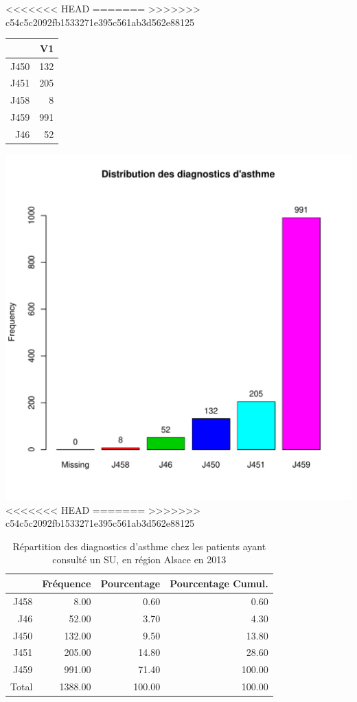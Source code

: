 \documentclass[12pt,english,french,twoside]{book}\usepackage[]{graphicx}\usepackage[]{color}
\makeatletter
\def\maxwidth{ %
  \ifdim\Gin@nat@width>\linewidth
    \linewidth
  \else
    \Gin@nat@width
  \fi
}
\makeatother
\begin{document}
<<<<<<< HEAD
=======
>>>>>>> c54c5c2092fb1533271e395c561ab3d562e88125
\begin{table}[ht]
\centering
\begin{tabular}{rr}
  \hline
 & V1 \\ 
  \hline
J450 & 132 \\ 
  J451 & 205 \\ 
  J458 &   8 \\ 
  J459 & 991 \\ 
  J46 &  52 \\ 
   \hline
\end{tabular}
\end{table}

\includegraphics[width=\maxwidth]{figure/asthme} 
<<<<<<< HEAD
=======
>>>>>>> c54c5c2092fb1533271e395c561ab3d562e88125
\begin{table}[ht]
\centering
\begin{tabular}{rrrr}
  \hline
 & Fréquence & Pourcentage & Pourcentage Cumul. \\ 
  \hline
J458 & 8.00 & 0.60 & 0.60 \\ 
  J46 & 52.00 & 3.70 & 4.30 \\ 
  J450 & 132.00 & 9.50 & 13.80 \\ 
  J451 & 205.00 & 14.80 & 28.60 \\ 
  J459 & 991.00 & 71.40 & 100.00 \\ 
    Total & 1388.00 & 100.00 & 100.00 \\ 
   \hline
\end{tabular}
\caption[Répartition des diagnostics d'asthme]{Répartition des diagnostics d'asthme chez les patients ayant consulté un  SU, en région Alsace en 2013} 
\label{tab:asthme}
\end{table}
\end{document}
